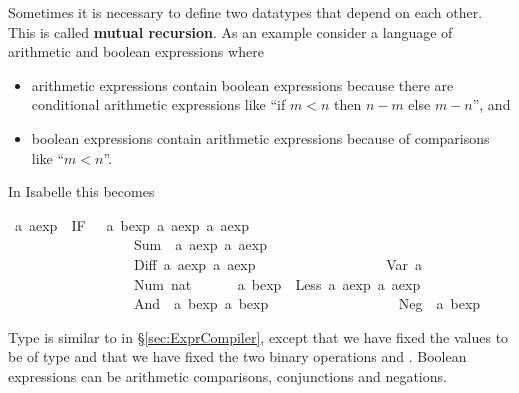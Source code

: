 %
\begin{isabellebody}%
\def\isabellecontext{ABexpr}%
%
\begin{isamarkuptext}%
Sometimes it is necessary to define two datatypes that depend on each
other. This is called \textbf{mutual recursion}. As an example consider a
language of arithmetic and boolean expressions where
\begin{itemize}
\item arithmetic expressions contain boolean expressions because there are
  conditional arithmetic expressions like ``if $m<n$ then $n-m$ else $m-n$'',
  and
\item boolean expressions contain arithmetic expressions because of
  comparisons like ``$m<n$''.
\end{itemize}
In Isabelle this becomes%
\end{isamarkuptext}%
\ {\isacharprime}a\ aexp\ {\isacharequal}\ IF\ \ \ {\isachardoublequote}{\isacharprime}a\ bexp{\isachardoublequote}\ {\isachardoublequote}{\isacharprime}a\ aexp{\isachardoublequote}\ {\isachardoublequote}{\isacharprime}a\ aexp{\isachardoublequote}\isanewline
\ \ \ \ \ \ \ \ \ \ \ \ \ \ \ \ \ {\isacharbar}\ Sum\ \ {\isachardoublequote}{\isacharprime}a\ aexp{\isachardoublequote}\ {\isachardoublequote}{\isacharprime}a\ aexp{\isachardoublequote}\isanewline
\ \ \ \ \ \ \ \ \ \ \ \ \ \ \ \ \ {\isacharbar}\ Diff\ {\isachardoublequote}{\isacharprime}a\ aexp{\isachardoublequote}\ {\isachardoublequote}{\isacharprime}a\ aexp{\isachardoublequote}\isanewline
\ \ \ \ \ \ \ \ \ \ \ \ \ \ \ \ \ {\isacharbar}\ Var\ {\isacharprime}a\isanewline
\ \ \ \ \ \ \ \ \ \ \ \ \ \ \ \ \ {\isacharbar}\ Num\ nat\isanewline
{}\ \ \ \ \ \ {\isacharprime}a\ bexp\ {\isacharequal}\ Less\ {\isachardoublequote}{\isacharprime}a\ aexp{\isachardoublequote}\ {\isachardoublequote}{\isacharprime}a\ aexp{\isachardoublequote}\isanewline
\ \ \ \ \ \ \ \ \ \ \ \ \ \ \ \ \ {\isacharbar}\ And\ \ {\isachardoublequote}{\isacharprime}a\ bexp{\isachardoublequote}\ {\isachardoublequote}{\isacharprime}a\ bexp{\isachardoublequote}\isanewline
\ \ \ \ \ \ \ \ \ \ \ \ \ \ \ \ \ {\isacharbar}\ Neg\ \ {\isachardoublequote}{\isacharprime}a\ bexp{\isachardoublequote}%
\begin{isamarkuptext}%
\noindent
Type  is similar to  in \S\ref{sec:ExprCompiler},
except that we have fixed the values to be of type  and that we
have fixed the two binary operations  and . Boolean
expressions can be arithmetic comparisons, conjunctions and negations.

\end{isamarkuptext}
\end{isabellebody}
